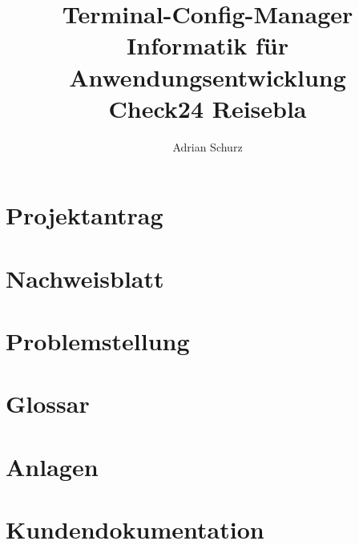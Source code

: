 \documentclass[a4paper,11pt]{scrartcl} %
\author{Adrian Schurz}
\title{Terminal-Config-Manager\\
	Informatik für Anwendungsentwicklung\\
	Check24 Reisebla\\ %
	}
\begin{document}

\maketitle
{}
\newpage

\section{Projektantrag}
\paragraph{}

\section{Nachweisblatt}
\paragraph{}

\newpage
\tableofcontents
\newpage


\section{Problemstellung}
\paragraph{}


\section{Glossar}


\section{Anlagen}

\section{Kundendokumentation}










\end{document}
